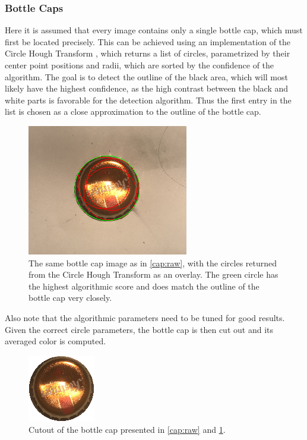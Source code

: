 \documentclass{article}
\begin{document}
\subsubsection{Bottle Caps} \label{caps}
Here it is assumed that every image contains only a single bottle cap, which must first be located precisely. 
This can be achieved using an implementation of the Circle Hough Transform \cite{DAVIES198837}, which returns a list of circles, parametrized by their center point positions and radii, which are sorted by the confidence of the algorithm. 
The goal is to detect the outline of the black area, which  will most likely have the highest confidence, as the high contrast between the black and white parts is favorable for the detection algorithm. Thus the first entry in the list is chosen as a close approximation to the outline of the bottle cap.
\begin{figure}[h]
        \begin{center}
        \includegraphics[width=0.5\linewidth]{cap_hough.png}
	\caption{The same bottle cap image as in \ref{cap:raw}, with the circles returned from the Circle Hough Transform as an overlay. The green circle has the highest algorithmic score and does match the outline of the bottle cap very closely.}
        \label{cap:hough}
\end{center}
\end{figure}
  
Also note that the algorithmic parameters need to be tuned for good results. 
Given the correct circle parameters, the bottle cap is then cut out and its averaged color is computed. 
\begin{figure}[h]
        \begin{center}
        \includegraphics[width=0.3\linewidth]{cap_cutout_white_2.png}
	\caption{Cutout of the bottle cap presented in \ref{cap:raw} and \ref{cap:hough}.}
        \label{cap:cut}
\end{center}
\end{figure}
\end{document}
